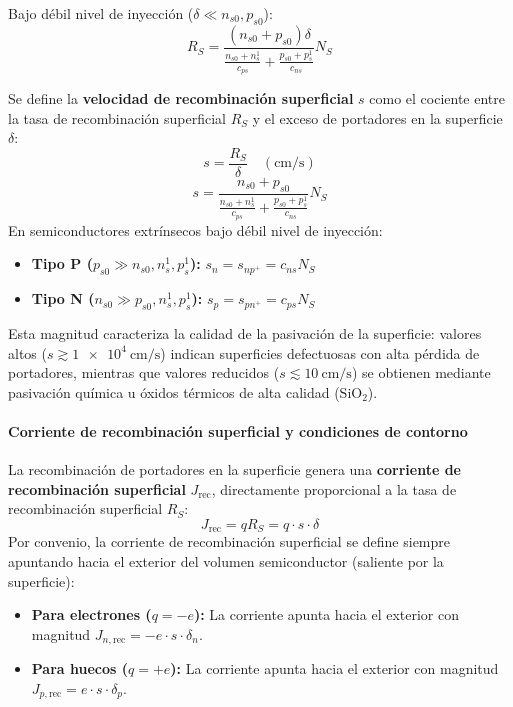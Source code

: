 Bajo débil nivel de inyección ($\delta \ll n_{s0}, p_{s0}$):
\[
R_S = \frac{(n_{s0} + p_{s0})\delta}{\frac{n_{s0} + n_s^1}{c_{ps}} + \frac{p_{s0} + p_s^1}{c_{ns}}} N_S
\]

\begin{concepto}
Se define la \textbf{velocidad de recombinación superficial} $s$ como el cociente entre la tasa de recombinación superficial $R_S$ y el exceso de portadores en la superficie $\delta$:
\[
s = \frac{R_S}{\delta} \quad \left( \si{\cm\per\second} \right)
\]
\[
s = \frac{n_{s0} + p_{s0}}{\frac{n_{s0} + n_s^1}{c_{ps}} + \frac{p_{s0} + p_s^1}{c_{ns}}} N_S
\]
En semiconductores extrínsecos bajo débil nivel de inyección:
\begin{itemize}
    \item \textbf{Tipo P ($p_{s0} \gg n_{s0}, n_s^1, p_s^1$):} $s_n = s_{np^+} = c_{ns} N_S$
    \item \textbf{Tipo N ($n_{s0} \gg p_{s0}, n_s^1, p_s^1$):} $s_p = s_{pn^+} = c_{ps} N_S$
\end{itemize}
Esta magnitud caracteriza la calidad de la pasivación de la superficie: valores altos ($s \gtrsim \SI{1e4}{\cm\per\second}$) indican superficies defectuosas con alta pérdida de portadores, mientras que valores reducidos ($s \lesssim \SI{10}{\cm\per\second}$) se obtienen mediante pasivación química u óxidos térmicos de alta calidad ($\text{SiO}_2$).
\end{concepto}
\newpage

\paragraph{Corriente de recombinación superficial y condiciones de contorno}

La recombinación de portadores en la superficie genera una \textbf{corriente de recombinación superficial} $J_{\text{rec}}$, directamente proporcional a la tasa de recombinación superficial $R_S$:
\[
J_{\text{rec}} = q R_S = q \cdot s \cdot \delta
\]
Por convenio, la corriente de recombinación superficial se define siempre apuntando hacia el exterior del volumen semiconductor (saliente por la superficie):
\begin{itemize}
    \item \textbf{Para electrones ($q = -e$):} La corriente apunta hacia el exterior con magnitud $J_{n,\text{rec}} = -e \cdot s \cdot \delta_n$.
    \item \textbf{Para huecos ($q = +e$):} La corriente apunta hacia el exterior con magnitud $J_{p,\text{rec}} = e \cdot s \cdot \delta_p$.
\end{itemize}

